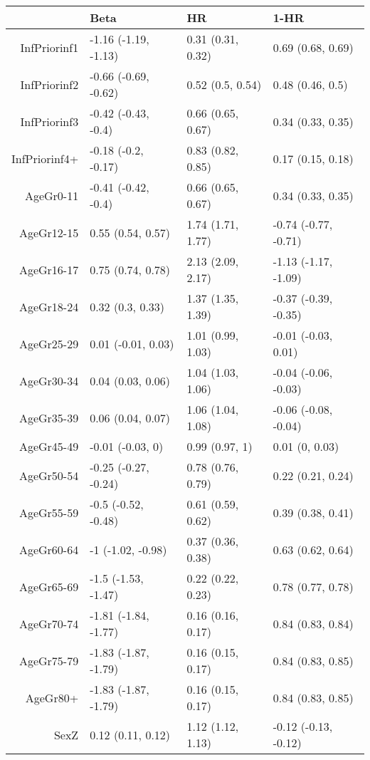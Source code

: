 \begin{table}[ht]
\centering
\begin{tabular}{rlll}
  \hline
 & Beta & HR & 1-HR \\ 
  \hline
InfPriorinf1 & -1.16 (-1.19, -1.13) & 0.31 (0.31, 0.32) & 0.69 (0.68, 0.69) \\ 
  InfPriorinf2 & -0.66 (-0.69, -0.62) & 0.52 (0.5, 0.54) & 0.48 (0.46, 0.5) \\ 
  InfPriorinf3 & -0.42 (-0.43, -0.4) & 0.66 (0.65, 0.67) & 0.34 (0.33, 0.35) \\ 
  InfPriorinf4+ & -0.18 (-0.2, -0.17) & 0.83 (0.82, 0.85) & 0.17 (0.15, 0.18) \\ 
  AgeGr0-11 & -0.41 (-0.42, -0.4) & 0.66 (0.65, 0.67) & 0.34 (0.33, 0.35) \\ 
  AgeGr12-15 & 0.55 (0.54, 0.57) & 1.74 (1.71, 1.77) & -0.74 (-0.77, -0.71) \\ 
  AgeGr16-17 & 0.75 (0.74, 0.78) & 2.13 (2.09, 2.17) & -1.13 (-1.17, -1.09) \\ 
  AgeGr18-24 & 0.32 (0.3, 0.33) & 1.37 (1.35, 1.39) & -0.37 (-0.39, -0.35) \\ 
  AgeGr25-29 & 0.01 (-0.01, 0.03) & 1.01 (0.99, 1.03) & -0.01 (-0.03, 0.01) \\ 
  AgeGr30-34 & 0.04 (0.03, 0.06) & 1.04 (1.03, 1.06) & -0.04 (-0.06, -0.03) \\ 
  AgeGr35-39 & 0.06 (0.04, 0.07) & 1.06 (1.04, 1.08) & -0.06 (-0.08, -0.04) \\ 
  AgeGr45-49 & -0.01 (-0.03, 0) & 0.99 (0.97, 1) & 0.01 (0, 0.03) \\ 
  AgeGr50-54 & -0.25 (-0.27, -0.24) & 0.78 (0.76, 0.79) & 0.22 (0.21, 0.24) \\ 
  AgeGr55-59 & -0.5 (-0.52, -0.48) & 0.61 (0.59, 0.62) & 0.39 (0.38, 0.41) \\ 
  AgeGr60-64 & -1 (-1.02, -0.98) & 0.37 (0.36, 0.38) & 0.63 (0.62, 0.64) \\ 
  AgeGr65-69 & -1.5 (-1.53, -1.47) & 0.22 (0.22, 0.23) & 0.78 (0.77, 0.78) \\ 
  AgeGr70-74 & -1.81 (-1.84, -1.77) & 0.16 (0.16, 0.17) & 0.84 (0.83, 0.84) \\ 
  AgeGr75-79 & -1.83 (-1.87, -1.79) & 0.16 (0.15, 0.17) & 0.84 (0.83, 0.85) \\ 
  AgeGr80+ & -1.83 (-1.87, -1.79) & 0.16 (0.15, 0.17) & 0.84 (0.83, 0.85) \\ 
  SexZ & 0.12 (0.11, 0.12) & 1.12 (1.12, 1.13) & -0.12 (-0.13, -0.12) \\ 
   \hline
\end{tabular}
\end{table}
